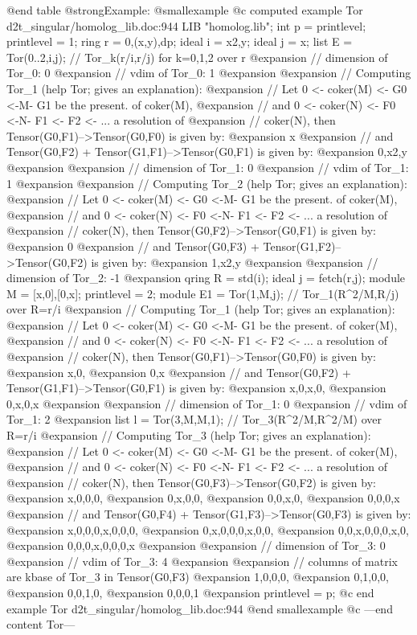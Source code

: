 @end table
@strong{Example:}
@smallexample
@c computed example Tor d2t_singular/homolog_lib.doc:944 
LIB "homolog.lib";
int p      = printlevel;
printlevel = 1;
ring r     = 0,(x,y),dp;
ideal i    = x2,y;
ideal j    = x;
list E     = Tor(0..2,i,j);    // Tor_k(r/i,r/j) for k=0,1,2 over r
@expansion{} // dimension of Tor_0:  0
@expansion{} // vdim of Tor_0:       1
@expansion{} 
@expansion{} // Computing Tor_1 (help Tor; gives an explanation):
@expansion{} // Let 0 <- coker(M) <- G0 <-M- G1 be the present. of coker(M),
@expansion{} // and 0 <- coker(N) <- F0 <-N- F1 <- F2 <- ... a resolution of
@expansion{} // coker(N), then Tensor(G0,F1)-->Tensor(G0,F0) is given by:
@expansion{} x
@expansion{} // and Tensor(G0,F2) + Tensor(G1,F1)-->Tensor(G0,F1) is given by:
@expansion{} 0,x2,y
@expansion{} 
@expansion{} // dimension of Tor_1:  0
@expansion{} // vdim of Tor_1:       1
@expansion{} 
@expansion{} // Computing Tor_2 (help Tor; gives an explanation):
@expansion{} // Let 0 <- coker(M) <- G0 <-M- G1 be the present. of coker(M),
@expansion{} // and 0 <- coker(N) <- F0 <-N- F1 <- F2 <- ... a resolution of
@expansion{} // coker(N), then Tensor(G0,F2)-->Tensor(G0,F1) is given by:
@expansion{} 0
@expansion{} // and Tensor(G0,F3) + Tensor(G1,F2)-->Tensor(G0,F2) is given by:
@expansion{} 1,x2,y
@expansion{} 
@expansion{} // dimension of Tor_2:  -1
@expansion{} 
qring R    = std(i);
ideal j    = fetch(r,j);
module M   = [x,0],[0,x];
printlevel = 2;
module E1  = Tor(1,M,j);       // Tor_1(R^2/M,R/j) over R=r/i
@expansion{} // Computing Tor_1 (help Tor; gives an explanation):
@expansion{} // Let 0 <- coker(M) <- G0 <-M- G1 be the present. of coker(M),
@expansion{} // and 0 <- coker(N) <- F0 <-N- F1 <- F2 <- ... a resolution of
@expansion{} // coker(N), then Tensor(G0,F1)-->Tensor(G0,F0) is given by:
@expansion{} x,0,
@expansion{} 0,x 
@expansion{} // and Tensor(G0,F2) + Tensor(G1,F1)-->Tensor(G0,F1) is given by:
@expansion{} x,0,x,0,
@expansion{} 0,x,0,x 
@expansion{} 
@expansion{} // dimension of Tor_1:  0
@expansion{} // vdim of Tor_1:       2
@expansion{} 
list l     = Tor(3,M,M,1);     // Tor_3(R^2/M,R^2/M) over R=r/i
@expansion{} // Computing Tor_3 (help Tor; gives an explanation):
@expansion{} // Let 0 <- coker(M) <- G0 <-M- G1 be the present. of coker(M),
@expansion{} // and 0 <- coker(N) <- F0 <-N- F1 <- F2 <- ... a resolution of
@expansion{} // coker(N), then Tensor(G0,F3)-->Tensor(G0,F2) is given by:
@expansion{} x,0,0,0,
@expansion{} 0,x,0,0,
@expansion{} 0,0,x,0,
@expansion{} 0,0,0,x 
@expansion{} // and Tensor(G0,F4) + Tensor(G1,F3)-->Tensor(G0,F3) is given by:
@expansion{} x,0,0,0,x,0,0,0,
@expansion{} 0,x,0,0,0,x,0,0,
@expansion{} 0,0,x,0,0,0,x,0,
@expansion{} 0,0,0,x,0,0,0,x 
@expansion{} 
@expansion{} // dimension of Tor_3:  0
@expansion{} // vdim of Tor_3:       4
@expansion{} 
@expansion{} // columns of matrix are kbase of Tor_3 in Tensor(G0,F3)
@expansion{} 1,0,0,0,
@expansion{} 0,1,0,0,
@expansion{} 0,0,1,0,
@expansion{} 0,0,0,1 
@expansion{} 
printlevel = p;
@c end example Tor d2t_singular/homolog_lib.doc:944
@end smallexample
@c ---end content Tor---

